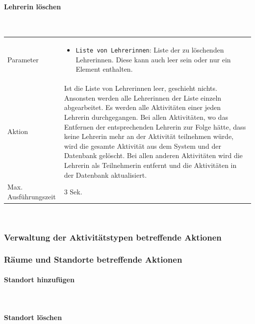 \documentclass[fontsize=12pt,paper=a4,twoside]{scrartcl}
\begin{document}
\paragraph{Lehrerin löschen}\mbox{}\\

\begin{tabularx}{\textwidth}{p{4cm}X}
Parameter & \begin{itemize}[itemsep=0pt, leftmargin = 0.5cm]
			\item \texttt{Liste von Lehrerinnen}: Liste der zu löschenden Lehrerinnen. Diese kann auch leer sein oder nur ein Element enthalten.
			\end{itemize}\\
Aktion & Ist die Liste von Lehrerinnen leer, geschieht nichts. Ansonsten werden alle Lehrerinnen der Liste einzeln abgearbeitet. Es werden alle Aktivitäten einer jeden Lehrerin durchgegangen. Bei allen Aktivitäten, wo das Entfernen der entsprechenden Lehrerin zur Folge hätte, dass keine Lehrerin mehr an der Aktivität teilnehmen würde, wird die gesamte Aktivität aus dem System und der Datenbank gelöscht. Bei allen anderen Aktivitäten wird die Lehrerin als Teilnehmerin entfernt und die Aktivitäten in der Datenbank aktualisiert. \\
Max. Ausführungszeit & 3 Sek. 
\end{tabularx}\\


\subsubsection{Verwaltung der Aktivitätstypen betreffende Aktionen}



\subsubsection{Räume und Standorte betreffende Aktionen}

\paragraph{Standort hinzufügen}\mbox{}\\

\paragraph{Standort löschen}\mbox{}\\
\end{document}
